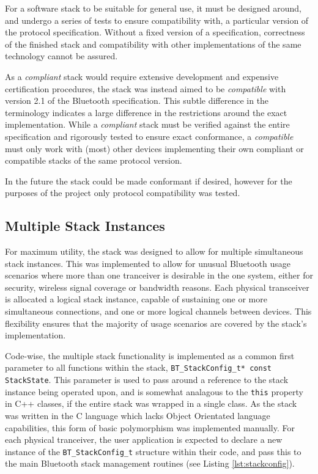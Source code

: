 For a software stack to be suitable for general use, it must be designed around, and undergo a series of tests to ensure compatibility with, a particular version of the protocol specification. Without a fixed version of a specification, correctness of the finished stack and compatibility with other implementations of the same technology cannot be assured.

As a \textit{compliant} stack would require extensive development and expensive certification procedures, the stack was instead aimed to be \textit{compatible} with version 2.1 of the Bluetooth specification. This subtle difference in the terminology indicates a large difference in the restrictions around the exact implementation. While a \textit{compliant} stack must be verified against the entire specification and rigorously tested to ensure exact conformance, a \textit{compatible} must only work with (most) other devices implementing their own compliant or compatible stacks of the same protocol version.

In the future the stack could be made conformant if desired, however for the purposes of the project only protocol compatibility was tested.

\FloatBarrier
\subsection{Multiple Stack Instances}

For maximum utility, the stack was designed to allow for multiple simultaneous stack instances. This was implemented to allow for unusual Bluetooth usage scenarios where more than one tranceiver is desirable in the one system, either for security, wireless signal coverage or bandwidth reasons. Each physical transceiver is allocated a logical stack instance, capable of sustaining one or more simultaneous connections, and one or more logical channels between devices. This flexibility ensures that the majority of usage scenarios are covered by the stack's implementation.

Code-wise, the multiple stack functionality is implemented as a common first parameter to all functions within the stack, \lstinline{BT_StackConfig_t* const StackState}. This parameter is used to pass around a reference to the stack instance being operated upon, and is somewhat analagous to the \lstinline{this} property in C++ classes, if the entire stack was wrapped in a single class. As the stack was written in the C language which lacks Object Orientated language capabilities, this form of basic polymorphism was implemented manually. For each physical tranceiver, the user application is expected to declare a new instance of the \lstinline{BT_StackConfig_t} structure within their code, and pass this to the main Bluetooth stack management routines (see Listing \ref{lst:stackconfig}).

